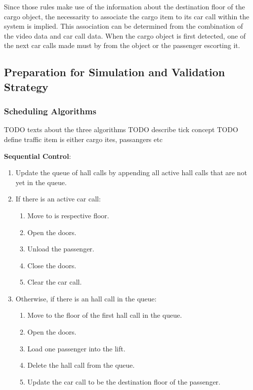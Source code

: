 Since those rules make use of the information about the destination floor of the cargo object, the necessarity to associate the cargo item to its car call within the system is implied.
This association can be determined from the combination of the video data and car call data.
When the cargo object is first detected, one of the next car calls made must by from the object or the passenger escorting it.

\subsection{Preparation for Simulation and Validation Strategy}

\subsubsection{Scheduling Algorithms}

TODO texts about the three algorithms
TODO describe tick concept
TODO define traffic item is either cargo ites, passangers etc

\textbf{Sequential Control}:
\begin{enumerate}[noitemsep]
    \item Update the queue of hall calls by appending all active hall calls that are not yet in the queue.
    \item If there is an active car call:
    \begin{enumerate}[noitemsep]
        \item Move to is respective floor.
        \item Open the doors.
        \item Unload the passenger. 
        \item Close the doors. 
        \item Clear the car call.
    \end{enumerate}
    \item Otherwise, if there is an hall call in the queue:
    \begin{enumerate}[noitemsep]
        \item Move to the floor of the first hall call in the queue. 
        \item Open the doors.
        \item Load one passenger into the lift. 
        \item Delete the hall call from the queue.
        \item Update the car call to be the destination floor of the passenger.
    \end{enumerate}
\end{enumerate}

